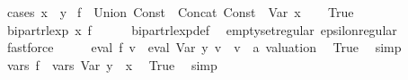 \begin{isabellebody}
%
\isadelimproof
%
\endisadelimproof
%
\isatagproof
{}\isamarkupfalse%
\ {\isacharparenleft}{\kern0pt}cases\ {\isachardoublequoteopen}x\ {\isacharequal}{\kern0pt}\ y{\isachardoublequoteclose}{\isacharparenright}{\kern0pt}\isanewline
{}\isamarkupfalse%
\ {\isacharquery}{\kern0pt}f{\isacharprime}{\kern0pt}\ {\isacharequal}{\kern0pt}\ {\isachardoublequoteopen}Union\ {\isacharparenleft}{\kern0pt}Const\ {\isacharbraceleft}{\kern0pt}{\isacharbraceright}{\kern0pt}{\isacharparenright}{\kern0pt}\ {\isacharparenleft}{\kern0pt}Concat\ {\isacharparenleft}{\kern0pt}Const\ {\isacharbraceleft}{\kern0pt}{\isacharbrackleft}{\kern0pt}{\isacharbrackright}{\kern0pt}{\isacharbraceright}{\kern0pt}{\isacharparenright}{\kern0pt}\ {\isacharparenleft}{\kern0pt}Var\ x{\isacharparenright}{\kern0pt}{\isacharparenright}{\kern0pt}{\isachardoublequoteclose}\isanewline
\ \ \isamarkupfalse%
\ True\isanewline
\ \ \isamarkupfalse%
\ \isamarkupfalse%
\ {\isachardoublequoteopen}bipart{\isacharunderscore}{\kern0pt}rlexp\ x\ {\isacharquery}{\kern0pt}f{\isacharprime}{\kern0pt}{\isachardoublequoteclose}\isanewline
\ \ \ \ \isamarkupfalse%
\ bipart{\isacharunderscore}{\kern0pt}rlexp{\isacharunderscore}{\kern0pt}def\ \isamarkupfalse%
\ emptyset{\isacharunderscore}{\kern0pt}regular\ epsilon{\isacharunderscore}{\kern0pt}regular\ \isamarkupfalse%
\ fastforce\isanewline
\ \ \isamarkupfalse%
\ \isamarkupfalse%
\ {\isachardoublequoteopen}eval\ {\isacharquery}{\kern0pt}f{\isacharprime}{\kern0pt}\ v\ {\isacharequal}{\kern0pt}\ eval\ {\isacharparenleft}{\kern0pt}Var\ y{\isacharparenright}{\kern0pt}\ v{\isachardoublequoteclose}\ \ v\ {\isacharcolon}{\kern0pt}{\isacharcolon}{\kern0pt}\ {\isachardoublequoteopen}{\isacharprime}{\kern0pt}a\ valuation{\isachardoublequoteclose}\ \isamarkupfalse%
\ True\ \isamarkupfalse%
\ simp\isanewline
\ \ \isamarkupfalse%
\ \isamarkupfalse%
\ {\isachardoublequoteopen}vars\ {\isacharquery}{\kern0pt}f{\isacharprime}{\kern0pt}\ {\isacharequal}{\kern0pt}\ vars\ {\isacharparenleft}{\kern0pt}Var\ y{\isacharparenright}{\kern0pt}\ {\isasymunion}\ {\isacharbraceleft}{\kern0pt}x{\isacharbraceright}{\kern0pt}{\isachardoublequoteclose}\ \isamarkupfalse%
\ True\ \isamarkupfalse%
\ simp\isanewline
\ \ \isamarkupfalse%
\ \isamarkupfalse%

\end{isabellebody}
